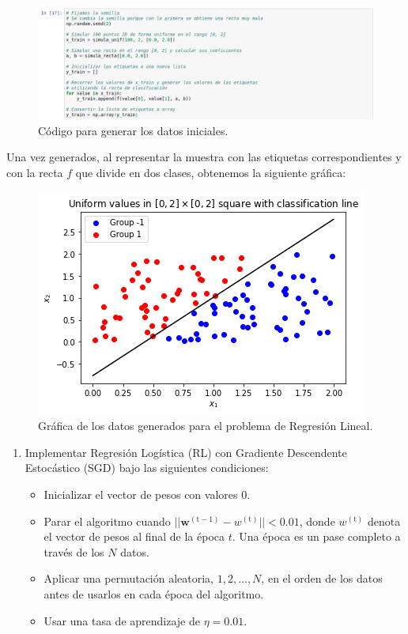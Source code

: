 \documentclass[11pt,a4paper]{article}
\begin{document}
\begin{figure}[H]
\centering
\includegraphics[scale=0.4]{img/init_data.png}
\caption{Código para generar los datos iniciales.}
\end{figure}

Una vez generados, al representar la muestra con las etiquetas correspondientes y con la recta
$f$ que divide en dos clases, obtenemos la siguiente gráfica:

\begin{figure}[H]
\centering
\includegraphics[scale=0.6]{img/regression_1.png}
\caption{Gráfica de los datos generados para el problema de Regresión Lineal.}
\end{figure}

\begin{enumerate}[label=\textit{\alph*})]
	\item Implementar Regresión Logística (RL) con Gradiente Descendente Estocástico (SGD)
	bajo las siguientes condiciones:
	
	\begin{itemize}
		\item Inicializar el vector de pesos con valores 0.
		\item Parar el algoritmo cuando
		$||\mathbf{w}^{(\text{t}-1)} - w^{(\text{t})} || < 0.01$, donde $w^{(\text{t})}$ denota el
		vector de pesos al final de la época $t$. Una época es un pase completo a través de los $N$
		datos.
		\item Aplicar una permutación aleatoria, $1, 2, \dots , N$, en el orden de los datos antes de
		usarlos en cada época del algoritmo.
		\item Usar una tasa de aprendizaje de $\eta = 0.01$.
	\end{itemize}
\end{enumerate}
\end{document}
